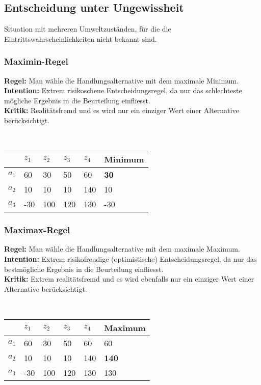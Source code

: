 \subsection{Entscheidung unter Ungewissheit}
Situation mit mehreren Umweltzuständen, für die die Eintrittswahrscheinlichkeiten nicht bekannt sind.

\subsubsection{Maximin-Regel}
\textbf{Regel:} Man wähle die Handlungsalternative mit dem maximale Minimum. \\
\textbf{Intention:} Extrem risikoscheue Entscheidungsregel, da nur das schlechteste mögliche Ergebnis in die Beurteilung einfliesst.\\
\textbf{Kritik:} Realitätsfremd und es wird nur ein einziger Wert einer Alternative berücksichtigt.
\begin{example} \\
	\begin{tabular}{|l|l|l|l|l|l|}
		\hline
		& $z_1$ & $z_2$ & $z_3$ & $z_4$ & Minimum \\ \hline
		$a_1$ & 60 & 30 & 50 & 60 & \textbf{30} \\ \hline
		$a_2$ & 10 & 10 & 10 & 140 & 10 \\ \hline
		$a_3$ & -30 & 100 & 120 & 130 & -30 \\ \hline		
	\end{tabular}
\end{example}

\subsubsection{Maximax-Regel}
\textbf{Regel:} Man wähle die Handlungsalternative mit dem maximale Maximum. \\
\textbf{Intention:} Extrem risikofreudige (optimistische) Entscheidungsregel, da nur das bestmögliche Ergebnis in die Beurteilung einfliesst.\\
\textbf{Kritik:} Extrem realitätsfremd und es wird ebenfalls nur ein einziger Wert einer Alternative berücksichtigt.
\begin{example} \\
	\begin{tabular}{|l|l|l|l|l|l|}
		\hline
		& $z_1$ & $z_2$ & $z_3$ & $z_4$ & Maximum \\ \hline
		$a_1$ & 60 & 30 & 50 & 60 & 60 \\ \hline
		$a_2$ & 10 & 10 & 10 & 140 & \textbf{140} \\ \hline
		$a_3$ & -30 & 100 & 120 & 130 & 130 \\ \hline		
	\end{tabular}
\end{example}

